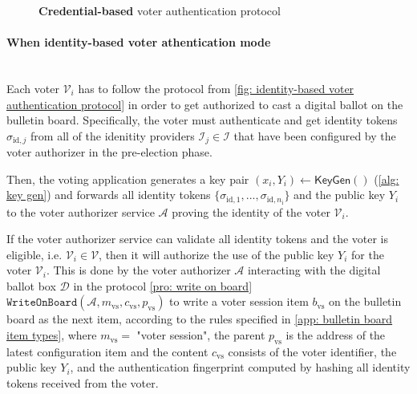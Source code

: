 \begin{figure}[ht]
    \caption{\textbf{Credential-based} voter authentication protocol}
    \label{fig: credential-based voter authentication protocol}
\end{figure}


\paragraph{When identity-based voter athentication mode}\mbox{}\\
Each voter $\mathcal{V}_i$ has to follow the protocol from \cref{fig: identity-based voter authentication protocol} in order to get authorized to cast a digital ballot on the bulletin board. Specifically, the voter must authenticate and get identity tokens $\sigma_{\mathrm{id}, j}$ from all of the idenitity providers $\mathcal{I}_j \in \boldsymbol{\mathcal{I}}$ that have been configured by the voter authorizer in the pre-election phase.

Then, the voting application generates a key pair $(x_i, Y_i) \gets \mathsf{KeyGen}()$ (\cref{alg: key gen}) and forwards all identity tokens $\{ \sigma_{\mathrm{id}, 1}, ..., \sigma_{\mathrm{id}, n_\mathrm{i}} \}$ and the public key $Y_i$ to the voter authorizer service $\mathcal{A}$ proving the identity of the voter $\mathcal{V}_i$.

If the voter authorizer service can validate all identity tokens and the voter is eligible, i.e. $\mathcal{V}_i \in \boldsymbol{\mathcal{V}}$, then it will authorize the use of the public key $Y_i$ for the voter $\mathcal{V}_i$. This is done by the voter authorizer $\mathcal{A}$ interacting with the digital ballot box $\mathcal{D}$ in the protocol \ref{pro: write on board} $\mathtt{WriteOnBoard}(\mathcal{A}, m_\mathrm{vs}, c_\mathrm{vs}, p_\mathrm{vs})$ to write a voter session item $b_\mathrm{vs}$ on the bulletin board as the next item, according to the rules specified in \cref{app: bulletin board item types}, where $m_\mathrm{vs} =$ "voter session", the parent $p_\mathrm{vs}$ is the address of the latest configuration item and the content $c_\mathrm{vs}$ consists of the voter identifier, the public key $Y_i$, and the authentication fingerprint computed by hashing all identity tokens received from the voter. 

